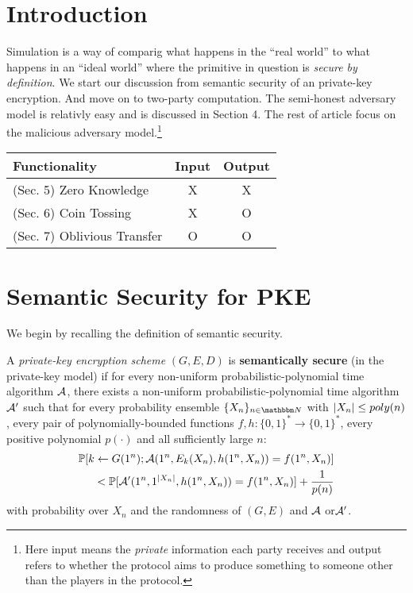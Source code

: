 \vspace*{4mm} 

\section{Introduction}
Simulation is a way of comparig what happens in the ``real world'' to what happens in an ``ideal world'' where the primitive in question is {\it secure by definition}. We start our discussion from semantic security of an private-key encryption. And move on to two-party computation. The semi-honest adversary model is relativly easy and is discussed in Section 4. The rest of article focus on the malicious adversary model.\footnote{Here input means the \textit{private} information each party receives and output refers to whether the protocol aims to produce something to someone other than the players in the protocol.}

\vspace{4mm}
\begin{tabular}{|l|c|c|}
\hline
Functionality & Input & Output\\
\hline
(Sec. 5) Zero Knowledge & X & X\\
(Sec. 6) Coin Tossing & X & O \\
(Sec. 7) Oblivious Transfer & O & O \\
\hline
\end{tabular}

\section{Semantic Security for PKE}
We begin by recalling the definition of semantic security.
\begin{definition} A {\it private-key encryption scheme} $(G,E,D)$ is {\bf semantically secure} (in the private-key model) if for every non-uniform probabilistic-polynomial time algorithm $\mathcal{A}$, there exists a non-uniform probabilistic-polynomial time algorithm $\mathcal{A}'$ such that for every probability ensemble $\{X_n\}_{n\in\N}$ with $\left|X_n\right|\leq poly(n)$, every pair of polynomially-bounded functions $f,h:\{0,1\}^*\to\{0,1\}^*$, every positive polynomial $p(\cdot)$ and all sufficiently large $n$:
\begin{align}
    \mathop{\mathbb P\/}[k\leftarrow G(1^n);\mathcal{A}(1^n,E_k(X_n), h(1^n,X_n)) = f(1^n, X_n)] \\
    < \mathop{\mathbb P\/}[\mathcal{A}'(1^n,1^{\left|X_n\right|}, h(1^n,X_n)) = f(1^n,X_n) ]+ \frac{1}{p(n)}\label{eq:semanticsecure}
\end{align}
with probability over $X_n$ and the randomness of $(G,E)$ and $\mathcal{A}$ or$\mathcal{A}'$.
\end{definition}

